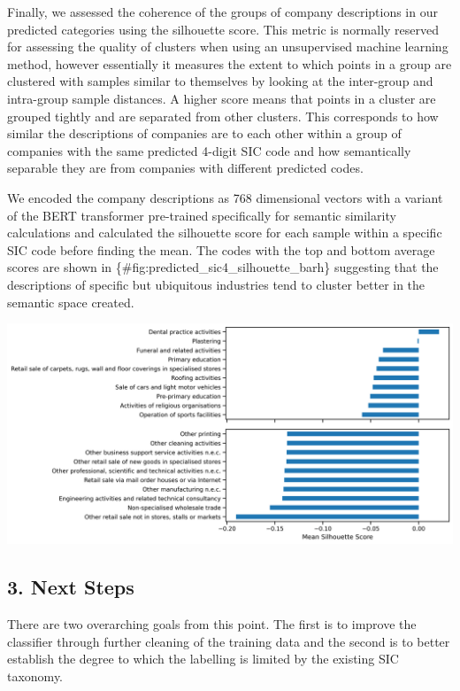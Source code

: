 \documentclass[
]{article}
\begin{document}
Finally, we assessed the coherence of the groups of company descriptions
in our predicted categories using the silhouette score. This metric is
normally reserved for assessing the quality of clusters when using an
unsupervised machine learning method, however essentially it measures
the extent to which points in a group are clustered with samples similar
to themselves by looking at the inter-group and intra-group sample
distances. A higher score means that points in a cluster are grouped
tightly and are separated from other clusters. This corresponds to how
similar the descriptions of companies are to each other within a group
of companies with the same predicted 4-digit SIC code and how
semantically separable they are from companies with different predicted
codes.

We encoded the company descriptions as 768 dimensional vectors with a
variant of the BERT transformer pre-trained specifically for semantic
similarity calculations and calculated the silhouette score for each
sample within a specific SIC code before finding the mean. The codes
with the top and bottom average scores are shown in
\{\#fig:predicted\_sic4\_silhouette\_barh\} suggesting that the
descriptions of specific but ubiquitous industries tend to cluster
better in the semantic space created.

\includegraphics{../../figures/predicted_sic4_silhouette_barh.png}

\hypertarget{next-steps}{%
\subsection{3. Next Steps}\label{next-steps}}

There are two overarching goals from this point. The first is to improve
the classifier through further cleaning of the training data and the
second is to better establish the degree to which the labelling is
limited by the existing SIC taxonomy.
\end{document}
